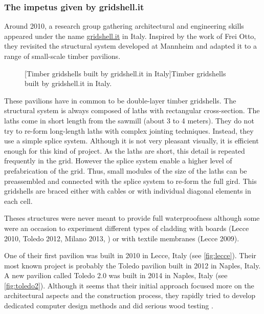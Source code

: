 \subsubsection{The impetus given by gridshell.it}
Around 2010, a research group gathering architectural and engineering skills appeared under the name \href{http://www.gridshell.it}{gridshell.it} in Italy. Inspired by the work of Frei Otto, they revisited the structural system developed at Mannheim and adapted it to a range of small-scale timber pavilions.
\begin{figure}[h]
		\hspace*{\fill}
		\vspace{10pt}
		[Timber gridshells built by gridshell.it in Italy]{Timber gridshells built by gridshell.it in Italy.}
		\label{fig:gsii}    
\end{figure}

These pavilions have in common to be double-layer timber gridshells. The structural system is always composed of laths with rectangular cross-section. The laths come in short length  from the sawmill (about 3 to 4 meters). They do not try to re-form long-length laths with complex jointing techniques. Instead, they use a simple splice system. Although it is not very pleasant visually, it is efficient enough for this kind of project. As the laths are short, this detail is repeated frequently in the grid. However the splice system enable a higher level of prefabrication of the grid. Thus, small modules of the size of the laths can be preassembled and connected with the splice system to re-form the full gird. This gridshells are braced either with cables or with individual diagonal elements in each cell.

Theses structures were never meant to provide full waterproofness although some were an occasion to experiment different types of cladding with boards (Lecce 2010, Toledo 2012, Milano 2013, ) or with textile membranes (Lecce 2009).

One of their first pavilion was built in 2010 in Lecce, Italy (see \cref{fig:lecce}). Their most known project is probably the Toledo pavilion built in 2012 in Naples, Italy.  A new pavilion called Toledo 2.0 was built in 2014 in Naples, Italy (see \cref{fig:toledo2}). Although it seems that their initial approach focused more on the architectural aspects and the construction process, they rapidly tried to develop dedicated computer design methods \cite{DAmico2014} and did serious wood testing \cite{DAmico2015a}.


